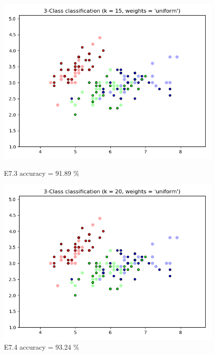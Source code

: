 \documentclass{classrep}
\begin{document}
\begin{figure}[H]
			\begin{minipage}{0.5\linewidth}
				\centering
				\includegraphics[scale=0.25]{KNN_iris_7_3.png}
				\caption{E7.3 accuracy = 91.89 \%}
				\label{E7.3}
			\end{minipage}
			\begin{minipage}{0.5\linewidth}
				\centering
				\includegraphics[scale=0.25]{KNN_iris_7_4.png}
				\caption{E7.4 accuracy = 93.24 \%}
				\label{E7.4}
			\end{minipage}
		\end{figure}
		\FloatBarrier
\end{document}
